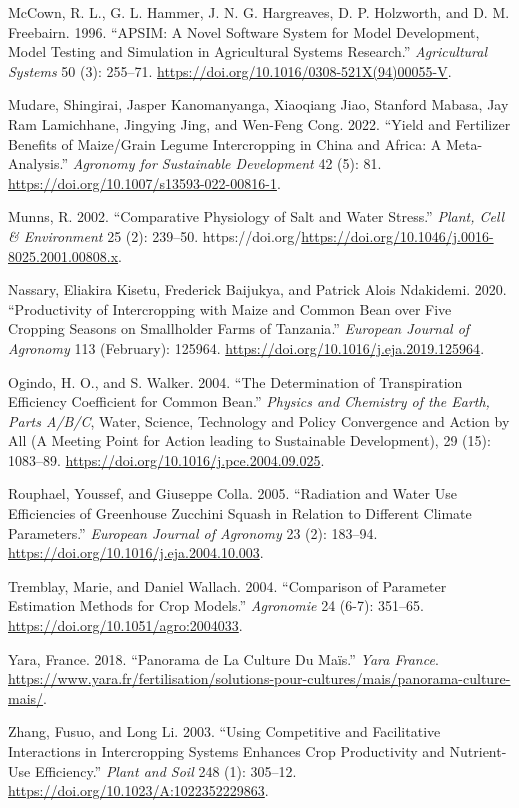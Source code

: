 \documentclass[
]{article}
\newlength{\cslhangindent}
\newenvironment{CSLReferences}[2] %
 {\begin{list}{}{%
  \setlength{\itemindent}{0pt}
  \setlength{\leftmargin}{0pt}
  \setlength{\parsep}{0pt}
  \ifodd #1
   \setlength{\leftmargin}{\cslhangindent}
   \setlength{\itemindent}{-1\cslhangindent}
  \fi
  \setlength{\itemsep}{#2\baselineskip}}}
 {\end{list}}
\begin{document}
\begin{CSLReferences}{1}{0}
McCown, R. L., G. L. Hammer, J. N. G. Hargreaves, D. P. Holzworth, and
D. M. Freebairn. 1996. {``{APSIM}: A Novel Software System for Model
Development, Model Testing and Simulation in Agricultural Systems
Research.''} \emph{Agricultural Systems} 50 (3): 255--71.
\url{https://doi.org/10.1016/0308-521X(94)00055-V}.

Mudare, Shingirai, Jasper Kanomanyanga, Xiaoqiang Jiao, Stanford Mabasa,
Jay Ram Lamichhane, Jingying Jing, and Wen-Feng Cong. 2022. {``Yield and
Fertilizer Benefits of Maize/Grain Legume Intercropping in {China} and
{Africa}: {A} Meta-Analysis.''} \emph{Agronomy for Sustainable
Development} 42 (5): 81.
\url{https://doi.org/10.1007/s13593-022-00816-1}.

Munns, R. 2002. {``Comparative Physiology of Salt and Water Stress.''}
\emph{Plant, Cell \& Environment} 25 (2): 239--50.
https://doi.org/\url{https://doi.org/10.1046/j.0016-8025.2001.00808.x}.

Nassary, Eliakira Kisetu, Frederick Baijukya, and Patrick Alois
Ndakidemi. 2020. {``Productivity of Intercropping with Maize and Common
Bean over Five Cropping Seasons on Smallholder Farms of {Tanzania}.''}
\emph{European Journal of Agronomy} 113 (February): 125964.
\url{https://doi.org/10.1016/j.eja.2019.125964}.

Ogindo, H. O., and S. Walker. 2004. {``The Determination of
Transpiration Efficiency Coefficient for Common Bean.''} \emph{Physics
and Chemistry of the Earth, Parts A/B/C}, Water, {Science}, {Technology}
and {Policy} {Convergence} and {Action} by {All} ({A} {Meeting} {Point}
for {Action} leading to {Sustainable} {Development}), 29 (15): 1083--89.
\url{https://doi.org/10.1016/j.pce.2004.09.025}.

Rouphael, Youssef, and Giuseppe Colla. 2005. {``Radiation and Water Use
Efficiencies of Greenhouse Zucchini Squash in Relation to Different
Climate Parameters.''} \emph{European Journal of Agronomy} 23 (2):
183--94. \url{https://doi.org/10.1016/j.eja.2004.10.003}.

Tremblay, Marie, and Daniel Wallach. 2004. {``Comparison of Parameter
Estimation Methods for Crop Models.''} \emph{Agronomie} 24 (6-7):
351--65. \url{https://doi.org/10.1051/agro:2004033}.

Yara, France. 2018. {``Panorama de La Culture Du Maïs.''} \emph{Yara
France}.
\url{https://www.yara.fr/fertilisation/solutions-pour-cultures/mais/panorama-culture-mais/}.

Zhang, Fusuo, and Long Li. 2003. {``Using Competitive and Facilitative
Interactions in Intercropping Systems Enhances Crop Productivity and
Nutrient-Use Efficiency.''} \emph{Plant and Soil} 248 (1): 305--12.
\url{https://doi.org/10.1023/A:1022352229863}.

\end{CSLReferences}
\end{document}
